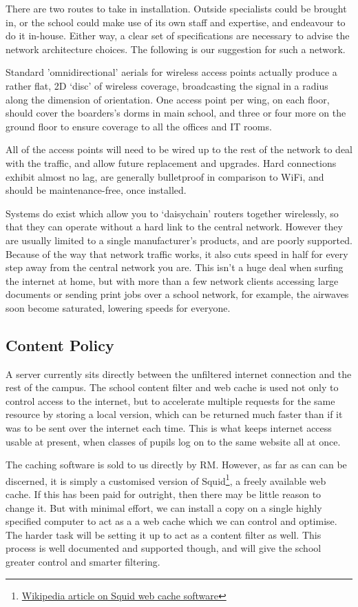 \documentclass[a4paper,leqno,titlepage]{article}
\begin{document}
There are two routes to take in installation.
Outside specialists could be brought in, or the
school could make use of its own staff and expertise,
and endeavour to do it in-house.
Either way, a clear set of specifications are necessary to advise the network
architecture choices. The following is our suggestion for such a network.


Standard 'omnidirectional' aerials for wireless access points
actually produce a rather flat, 2D `disc' of wireless coverage, broadcasting
the signal in a radius along the dimension of orientation.
One access point per wing, on each floor, should cover the boarders's
dorms in main school, and three or four more on the ground floor to ensure
coverage to all the offices and IT rooms.


All of the access points will need to be wired up to the rest of the network
to deal with the traffic, and allow future replacement and upgrades.
Hard connections exhibit almost no lag, are generally bulletproof in
comparison to WiFi, and should be maintenance-free, once installed.


Systems do exist which allow you to `daisychain' routers together wirelessly,
so that they can operate without a hard link to the central network. However
they are usually limited to a single manufacturer's products,
and are poorly supported. Because of the way that network traffic works,
it also cuts speed in half for every step away from the central network you are.
This isn't a huge deal when surfing the internet at home,
but with more than a few network clients accessing large documents or sending
print jobs over a school network, for example,
the airwaves soon become saturated, lowering speeds for everyone.


\subsection{Content Policy}

A server currently sits directly between the unfiltered internet connection and
the rest of the campus. The school content filter and web cache is used not only
to control access to the internet, but to accelerate multiple requests for the
same resource by storing a local version, which can be returned much faster than
if it was to be sent over the internet each time. This is what keeps internet
access usable at present, when classes of pupils log on to the same website
all at once.


The caching software is sold to us directly by RM. However, as far as can can
be discerned, it is simply a customised version of
Squid\footnote{\href{http://en.wikipedia.org/wiki/Squid_(software)}{Wikipedia article on Squid web cache software}},
a freely available web cache. If this has been paid for outright, then there
may be little reason to change it. But with minimal effort, we can install a
copy on a single highly specified computer to act as a a web cache which we
can control and optimise. The harder task will be setting it up to act as a
content filter as well. This process is well documented and supported though,
and will give the school greater control and smarter filtering.
\end{document}
